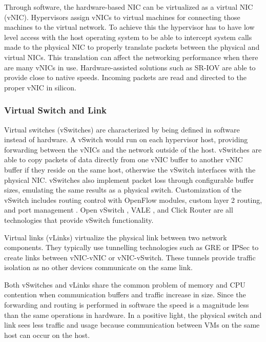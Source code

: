 \documentclass[12pt]{article}
\begin{document}
Through software, the hardware-based NIC can be virtualized as a virtual NIC (vNIC). Hypervisors assign vNICs to virtual machines for connecting those machines to the virtual network. To achieve this the hypervisor has to have low level access with the host operating system to be able to intercept system calls made to the physical NIC to properly translate packets between the physical and virtual NICs. This translation can affect the networking performance when there are many vNICs in use. Hardware-assisted solutions such as SR-IOV \cite{dong2012renic} are able to provide close to native speeds. Incoming packets are read and directed to the proper vNIC in silicon.



\subsubsection{Virtual Switch and Link}

Virtual switches (vSwitches) are characterized by being defined in software instead of hardware. A vSwitch would run on each hypervisor host, providing forwarding between the vNICs and the network outside of the host. vSwitches are able to copy packets of data directly from one vNIC buffer to another vNIC buffer if they reside on the same host, otherwise the vSwitch interfaces with the physical NIC. vSwitches also implement packet loss through configurable buffer sizes, emulating the same results as a physical switch. Customization of the vSwitch includes routing control with OpenFlow modules, custom layer 2 routing, and port management \cite{wang2015survey}. Open vSwitch \cite{crisan2013openvswitch}, VALE \cite{rizzo2012vale}, and Click Router \cite{wang2013clickrouter} are all technologies that provide vSwitch functionality.

Virtual links (vLinks) virtualize the physical link between two network components. They typically use tunnelling technologies such as GRE or IPSec to create links between vNIC-vNIC or vNIC-vSwitch. These tunnels provide traffic isolation as no other devices communicate on the same link.

Both vSwitches and vLinks share the common problem of memory and CPU contention when communication buffers and traffic increase in size. Since the forwarding and routing is performed in software the speed is a magnitude less than the same operations in hardware. In a positive light, the physical switch and link sees less traffic and usage because communication between VMs on the same host can occur on the host.
\end{document}
